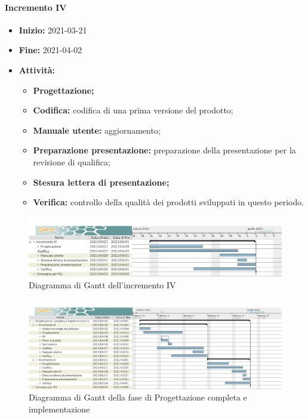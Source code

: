 \paragraph[Incremento IV]{Incremento IV}
\begin{itemize}
    \item [] \textbf{Inizio:} 2021-03-21
    \item [] \textbf{Fine:} 2021-04-02
    \item [] \textbf{Attività:}
          \begin{itemize}
              \item \textbf{Progettazione;}
              \item \textbf{Codifica:} codifica di una prima versione del prodotto;
              \item \textbf{Manuale utente:} aggiornamento;
              \item \textbf{Preparazione presentazione:} preparazione della presentazione per la revisione di qualifica;
              \item \textbf{Stesura lettera di presentazione;}
              \item \textbf{Verifica:} controllo della qualità dei prodotti sviluppati in questo periodo.
          \end{itemize}
\end{itemize}

\begin{figure}[H]
    \centering
    \includegraphics[width=1\linewidth]{res/images/pianificazione/incremento_4.png}
    \caption{Diagramma di Gantt dell'incremento IV}
    \label{fig:_Gantt incremento IV}
\end{figure}

\begin{figure}[H]
    \centering
    \includegraphics[width=1\linewidth]{res/images/pianificazione/progettazione_completa_e_implementazione.png}
    \caption{Diagramma di Gantt della fase di Progettazione completa e implementazione}
    \label{fig:_Gantt progettazione completa e implementazione}
\end{figure}

